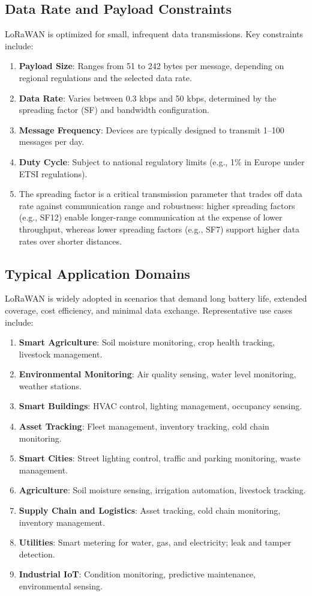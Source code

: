 \subsection{Data Rate and Payload Constraints}
LoRaWAN is optimized for small, infrequent data transmissions. Key constraints include:
\begin{enumerate}
    \item \textbf{Payload Size}: Ranges from 51 to 242 bytes per message, depending on regional regulations and the selected data rate.
    \item \textbf{Data Rate}: Varies between 0.3 kbps and 50 kbps, determined by the spreading factor (SF) and bandwidth configuration.
    \item \textbf{Message Frequency}: Devices are typically designed to transmit 1–100 messages per day.
    \item \textbf{Duty Cycle}: Subject to national regulatory limits (e.g., 1\% in Europe under ETSI regulations).
    \item The spreading factor is a critical transmission parameter that trades off data rate against communication range and robustness: higher spreading factors (e.g., SF12) enable longer-range communication at the expense of lower throughput, whereas lower spreading factors (e.g., SF7) support higher data rates over shorter distances.
\end{enumerate}

\subsection{Typical Application Domains}
LoRaWAN is widely adopted in scenarios that demand long battery life, extended coverage, cost efficiency, and minimal data exchange. Representative use cases include:

\begin{enumerate}
    \item \textbf{Smart Agriculture}: Soil moisture monitoring, crop health tracking, livestock management.
    \item \textbf{Environmental Monitoring}: Air quality sensing, water level monitoring, weather stations.
    \item \textbf{Smart Buildings}: HVAC control, lighting management, occupancy sensing.
    \item \textbf{Asset Tracking}: Fleet management, inventory tracking, cold chain monitoring.
    \item \textbf{Smart Cities}: Street lighting control, traffic and parking monitoring, waste management.
    \item \textbf{Agriculture}: Soil moisture sensing, irrigation automation, livestock tracking.
    \item \textbf{Supply Chain and Logistics}: Asset tracking, cold chain monitoring, inventory management.
    \item \textbf{Utilities}: Smart metering for water, gas, and electricity; leak and tamper detection.
    \item \textbf{Industrial IoT}: Condition monitoring, predictive maintenance, environmental sensing.
\end{enumerate}

